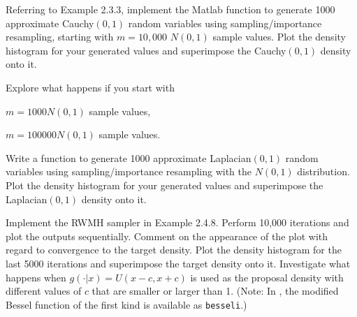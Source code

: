 \begin{exercise}
\begin{asparaenum}[(a)]
\item Referring to Example 2.3.3, implement the Matlab function to generate 1000 approximate Cauchy$(0,1)$ random variables using sampling/importance resampling, starting with $m = 10,000$ $N(0,1)$ sample values. Plot the density histogram for your generated values and superimpose the Cauchy$(0,1)$ density onto it.

\item Explore what happens if you start with 
\begin{inparaenum}[(i)]
\item $m = 1000 N(0,1)$ sample values, 
\item $m = 100000 N(0,1)$ sample values.
\end{inparaenum}
\end{asparaenum}
\end{exercise}

\begin{exercise}
Write a \Matlab function to generate 1000 approximate Laplacian$(0,1)$ random variables using sampling/importance resampling with the $N(0,1)$ distribution. Plot the density histogram for your generated values and superimpose the Laplacian$(0,1)$ density onto it.
\end{exercise}

\begin{exercise}
Implement the RWMH sampler in Example 2.4.8. Perform 10,000 iterations and plot the outputs sequentially. Comment on the appearance of the plot with regard to convergence to the target density. Plot the density histogram for the last 5000 iterations and superimpose the target density onto it. Investigate what happens when $g(\cdot|x)=U(x-c,x+c)$ is used as the proposal density with different values of $c$ that are smaller or larger than 1. (Note: In \Matlab, the modified Bessel function of the first kind is available as {\tt besseli}.)
\end{exercise}
